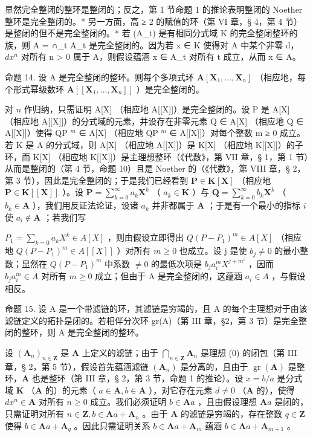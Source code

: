 显然完全整闭的整环是整闭的；反之，第 1 节命题 1 的推论表明整闭的 Noether 整环是完全整闭的。* 另一方面，高 ≥ 2 的赋值的环（第 VI 章，§ 4，第 4 节）是整闭的但不是完全整闭的。* 若 (A\_t) 是有相同分式域 K 的完全整闭整环的族，则 A = ∩\_t A\_t 是完全整闭的。因为若 x ∈ K 使得对 A 中某个非零 d，\(dx^n\) 对所有 n \textgreater{} 0 属于 A，则假设蕴涵 x ∈ A\_t 对所有 t 成立，从而 x ∈ A。

命题 14. 设 A 是完全整闭的整环。则每个多项式环 \(\mathbf{A}[\mathbf{X}_1,\ldots ,\mathbf{X}_n]\) （相应地，每个形式幂级数环 \(\mathbf{A}[[\mathbf{X}_1,\dots ,\mathbf{X}_n]]\) ）是完全整闭的。

对 \(n\) 作归纳，只需证明 A{[}X{]} （相应地 A{[}{[}X{]}{]}）是完全整闭的。设 P 是 A{[}X{]} （相应地 A{[}{[}X{]}{]}）的分式域的元素，并设存在非零元素 Q ∈ A{[}X{]} （相应地 Q ∈ A{[}{[}X{]}{]}）使得 QP \(^{m}\) ∈ A{[}X{]} （相应地 QP \(^{m}\) ∈ A{[}{[}X{]}{]}）对每个整数 m ≥ 0 成立。若 K 是 A 的分式域，则 A{[}X{]} （相应地 A{[}{[}X{]}{]}）是 K{[}X{]} （相应地 K{[}{[}X{]}{]}）的子环，而 K{[}X{]} （相应地 K{[}{[}X{]}{]}）是主理想整环（《代数》，第 VII 章，§ 1，第 1 节）从而是整闭的（第 4 节，命题 10）且是 Noether 的（《代数》，第 VIII 章，§ 2，第 3 节），因此是完全整闭的；于是我们已经看到 \(\mathbf{P} \in \mathbf{K}[\mathbf{X}]\) （相应地 \(\mathbf{P} \in \mathbf{K}[[\mathbf{X}]]\) ）。设 \(\mathbf{P} = \sum_{k=0}^{\infty} a_k \mathbf{X}^k\) （ \(a_k \in \mathbf{K}\) ）与 \(\mathbf{Q} = \sum_{k=0}^{\infty} b_k \mathbf{X}^k\) （ \(b_k \in \mathbf{A}\) ），我们用反证法论证，设诸 \(a_k\) 并非都属于 \(\mathbf{A}\) ；于是有一个最小的指标 \(i\) 使 \(a_i \notin \mathbf{A}\) ；若我们写

\(P_{1}=\sum_{k=0}a_{k}X^{k}\in A[X]\) ，则由假设立即得出 \(Q(P-P_{1})^{m}\in A[X]\) （相应地 \(Q(P-P_{1})^{m}\in A[[X]]\) ）对所有 \(m\geqslant0\) 也成立。设 j 是使 \(b_{j}\neq0\) 的最小整数；显然在 \(Q(P-P_{1})^{m}\) 中系数 \(\neq0\) 的最低次项是 \(b_{j}a_{i}^{m}X^{j+m^{i}}\) ，因而 \(b_{j}a_{i}^{m}\in A\) 对所有 \(m\geqslant0\) 成立；但由于 A 是完全整闭的，这蕴涵 \(a_{i}\in A\) ，与假设相反。

命题 15. 设 A 是一个带滤链的环，其滤链是穷竭的，且 A 的每个主理想对于由该滤链定义的拓扑是闭的。若相伴分次环 gr(A)（第 III 章，§2，第 3 节）是完全整闭的整环，则 A 是完全整闭的整环。

设 \((\mathbf{A}_n)_{n\in \mathbf{Z}}\) 是 \(\mathbf{A}\) 上定义的滤链；由于 \(\bigcap_{n\in \mathbf{Z}}\mathbf{A}_n\) 是理想 (0) 的闭包（第 III 章，§ 2，第 5 节），假设首先蕴涵滤链 \((\mathbf{A}_n)\) 是分离的，且由于 \(\operatorname{gr}(\mathbf{A})\) 是整环，\(\mathbf{A}\) 也是整环（第 III 章，§ 2，第 3 节，命题 1 的推论）。设 \(x = b / a\) 是分式域 \(\mathbf{K}\) （\(\mathbf{A}\) 的）的元素（ \(a\in \mathbf{A}, b\in \mathbf{A}\) ），对它存在元素 \(d\neq 0\) （\(\mathbf{A}\) 的），使得 \(dx^n\in \mathbf{A}\) 对所有 \(n\geqslant 0\) 成立。我们必须证明 \(b\in \mathbf{A}a\) ，且由假设理想 \(\mathbf{A}a\) 是闭的，只需证明对所有 \(n\in \mathbf{Z}, b\in \mathbf{A}a + \mathbf{A}_n\) 。由于 \(\mathbf{A}\) 的滤链是穷竭的，存在整数 \(q\in \mathbf{Z}\) 使得 \(b\in \mathbf{A}a + \mathbf{A}_q\) 。因此只需证明关系 \(b\in \mathbf{A}a + \mathbf{A}_m\) 蕴涵 \(b\in \mathbf{A}a + \mathbf{A}_{m + 1}\) 。

